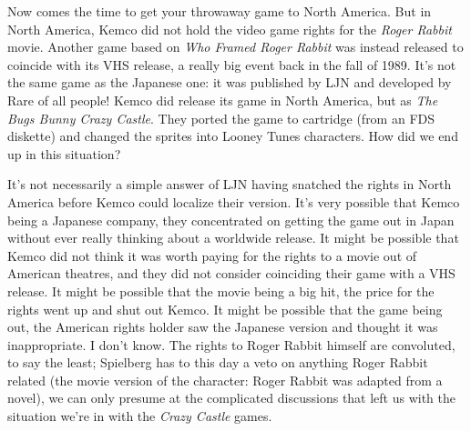 \documentclass{book}
\let\oldcenter\center
\let\oldendcenter\endcenter
\renewenvironment{center}{\setlength\topsep{0pt}\oldcenter}{\oldendcenter}
\begin{document}
\begin{center}
\vspace{8pt}
\quad\vspace{4pt}
\end{center}
Now comes the time to get your throwaway game to North America. But in North America, Kemco did not hold the video game rights for the \emph{Roger Rabbit} movie. Another game based on \emph{Who Framed Roger Rabbit} was instead released to coincide with its VHS release, a really big event back in the fall of 1989. It’s not the same game as the Japanese one: it was published by LJN and developed by Rare of all people! Kemco did release its game in North America, but as \emph{The Bugs Bunny Crazy Castle}. They ported the game to cartridge (from an FDS diskette) and changed the sprites into Looney Tunes characters. How did we end up in this situation?

It’s not necessarily a simple answer of LJN having snatched the rights in North America before Kemco could localize their version. It’s very possible that Kemco being a Japanese company, they concentrated on getting the game out in Japan without ever really thinking about a worldwide release. It might be possible that Kemco did not think it was worth paying for the rights to a movie out of American theatres, and they did not consider coinciding their game with a VHS release. It might be possible that the movie being a big hit, the price for the rights went up and shut out Kemco. It might be possible that the game being out, the American rights holder saw the Japanese version and thought it was inappropriate. I don’t know. The rights to Roger Rabbit himself are convoluted, to say the least; Spielberg has to this day a veto on anything Roger Rabbit related (the movie version of the character: Roger Rabbit was adapted from a novel), we can only presume at the complicated discussions that left us with the situation we’re in with the \emph{Crazy Castle} games.
\end{document}
